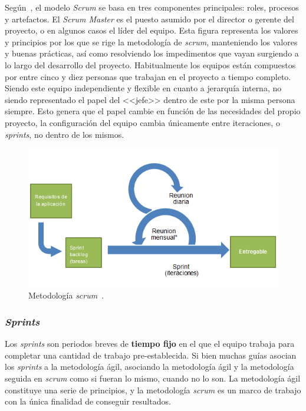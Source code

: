 Según~\cite{cervone2011understanding}, el modelo \textit{Scrum} se basa en tres componentes principales: roles, procesos y artefactos. El \textit{Scrum Master} es el puesto asumido por el director o gerente del proyecto, o en algunos casos el líder del equipo. Esta figura representa los valores y principios por los que se rige la metodología de \textit{scrum}, manteniendo los valores y buenas prácticas, así como resolviendo los impedimentos que vayan surgiendo a lo largo del desarrollo del proyecto. Habitualmente los equipos están compuestos por entre cinco y diez personas que trabajan en el proyecto a tiempo completo. Siendo este equipo independiente y flexible en cuanto a jerarquía interna, no siendo representado el papel del <<jefe>> dentro de este por la misma persona siempre. Esto genera que el papel cambie en función de las necesidades del propio proyecto, la configuración del equipo cambia únicamente entre iteraciones, o \textit{sprints}, no dentro de los mismos.

\begin{figure}[]
	\centering
	\includegraphics[scale=0.5]{../img/anexos/scrum-overview-es}
	\caption{Metodología \textit{scrum}~\cite{SCRUMWIKI}.}\label{img:scrum-overview}
\end{figure}

\subsubsection{\textit{Sprints}}
Los \textit{sprints} son periodos breves de \textbf{tiempo fijo} en el que el equipo trabaja para completar una cantidad de trabajo pre-establecida. Si bien muchas guías asocian los \textit{sprints} a la metodología ágil, asociando la metodología ágil y la metodología seguida en \textit{scrum} como si fueran lo mismo, cuando no lo son. La metodología ágil constituye una serie de principios, y la metodología \textit{scrum} es un marco de trabajo con la única finalidad de conseguir resultados.

